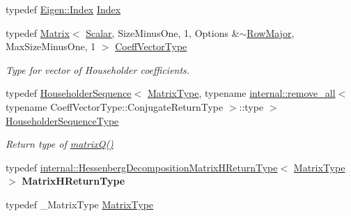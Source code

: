 \begin{DoxyCompactItemize}
typedef \hyperlink{namespace_eigen_a62e77e0933482dafde8fe197d9a2cfde}{Eigen\+::\+Index} \hyperlink{group___eigenvalues___module_a8e287ac222f53e2c8ce82faa43e95ac6}{Index}
\item 
typedef \hyperlink{group___core___module_class_eigen_1_1_matrix}{Matrix}$<$ \hyperlink{group___eigenvalues___module_a9420c36226cae7d92da8308a3f97ac2f}{Scalar}, Size\+Minus\+One, 1, Options \&$\sim$\hyperlink{group__enums_ggaacded1a18ae58b0f554751f6cdf9eb13acfcde9cd8677c5f7caf6bd603666aae3}{Row\+Major}, Max\+Size\+Minus\+One, 1 $>$ \hyperlink{group___eigenvalues___module_a567f99f3770365777b67bf9832b6fac1}{Coeff\+Vector\+Type}
\begin{DoxyCompactList}\small\item\em Type for vector of Householder coefficients. \end{DoxyCompactList}\item 
\mbox{\label{group___eigenvalues___module_a7c1188cd5d8f550c8941df75a50a7d08}} 
typedef \hyperlink{group___householder___module_class_eigen_1_1_householder_sequence}{Householder\+Sequence}$<$ \hyperlink{group___eigenvalues___module_a93a611350a7db9d1da18f2c828ecea9f}{Matrix\+Type}, typename \hyperlink{struct_eigen_1_1internal_1_1remove__all}{internal\+::remove\+\_\+all}$<$ typename Coeff\+Vector\+Type\+::\+Conjugate\+Return\+Type $>$\+::type $>$ \hyperlink{group___eigenvalues___module_a7c1188cd5d8f550c8941df75a50a7d08}{Householder\+Sequence\+Type}
\begin{DoxyCompactList}\small\item\em Return type of \hyperlink{group___eigenvalues___module_a346441e4902a58d43d698ac3da6ff791}{matrix\+Q()} \end{DoxyCompactList}\item 
\mbox{\label{group___eigenvalues___module_accca4cb1b5d78bc41defe77f01b4aada}} 
typedef \hyperlink{group___eigenvalues___module_struct_eigen_1_1internal_1_1_hessenberg_decomposition_matrix_h_return_type}{internal\+::\+Hessenberg\+Decomposition\+Matrix\+H\+Return\+Type}$<$ \hyperlink{group___eigenvalues___module_a93a611350a7db9d1da18f2c828ecea9f}{Matrix\+Type} $>$ {\bfseries Matrix\+H\+Return\+Type}
\item 
\mbox{\label{group___eigenvalues___module_a93a611350a7db9d1da18f2c828ecea9f}} 
typedef \+\_\+\+Matrix\+Type \hyperlink{group___eigenvalues___module_a93a611350a7db9d1da18f2c828ecea9f}{Matrix\+Type}

\end{DoxyCompactItemize}
